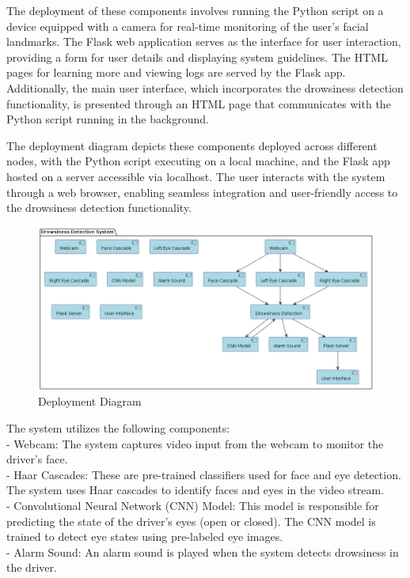 \documentclass[12pt]{article}
\begin{document}
The deployment of these components involves running the Python script on a device equipped with a camera for real-time monitoring of the user's facial landmarks. The Flask web application serves as the interface for user interaction, providing a form for user details and displaying system guidelines. The HTML pages for learning more and viewing logs are served by the Flask app. Additionally, the main user interface, which incorporates the drowsiness detection functionality, is presented through an HTML page that communicates with the Python script running in the background.

The deployment diagram depicts these components deployed across different nodes, with the Python script executing on a local machine, and the Flask app hosted on a server accessible via localhost. The user interacts with the system through a web browser, enabling seamless integration and user-friendly access to the drowsiness detection functionality.


\begin{figure}[h]
\centering
\includegraphics[width=1.0\textwidth]{DeD}
\caption{Deployment Diagram }
\end{figure}
\FloatBarrier
The system utilizes the following components:\\
- Webcam: The system captures video input from the webcam to monitor the driver's face.\\
- Haar Cascades: These are pre-trained classifiers used for face and eye detection. The system uses Haar cascades to identify faces and eyes in the video stream.\\
- Convolutional Neural Network (CNN) Model: This model is responsible for predicting the state of the driver's eyes (open or closed). The CNN model is trained to detect eye states using pre-labeled eye images.\\
- Alarm Sound: An alarm sound is played when the system detects drowsiness in the driver. 
\end{document}
